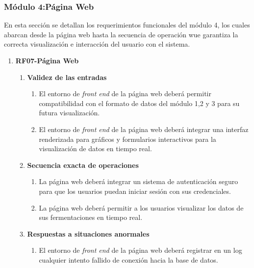 \subsubsection{Módulo 4:Página Web}

En esta sección se detallan los requerimientos funcionales del módulo 4,
los cuales abarcan desde la página web hasta la secuencia de operación wue
garantiza la correcta visualización e interacción del usuario con el sistema.

\begin{enumerate}
    \item \label{it:RF07} \textbf{RF07-Página Web}
        \begin{enumerate}
                \item \textbf{Validez de las entradas}
                    \begin{enumerate}
                        \item El entorno de \textit{front end} de la página web deberá permitir compatibilidad con el formato de datos del módulo 1,2 y 3 para su futura visualización.
                        \item El entorno de \textit{front end} de la página web 
                        deberá integrar una interfaz renderizada para gráficos y formularios interactivos para la visualización de datos en tiempo real.
                
                    \end{enumerate}   
                
                \item \textbf{Secuencia exacta de operaciones}
                    \begin{enumerate}
                        \item La página web deberá integrar un sistema de autenticación seguro para que los usuarios puedan iniciar sesión con sus credenciales.
                        \item La página web deberá permitir a los usuarios visualizar los datos de sus fermentaciones en tiempo real.
                    \end{enumerate}   
            
                \item \textbf{Respuestas a situaciones anormales}
                    \begin{enumerate}
                        \item El entorno de \textit{front end} de la página web deberá registrar en un log cualquier intento fallido de conexión hacia la base de datos.
                    \end{enumerate}   
        

\end{enumerate}
\end{enumerate}
